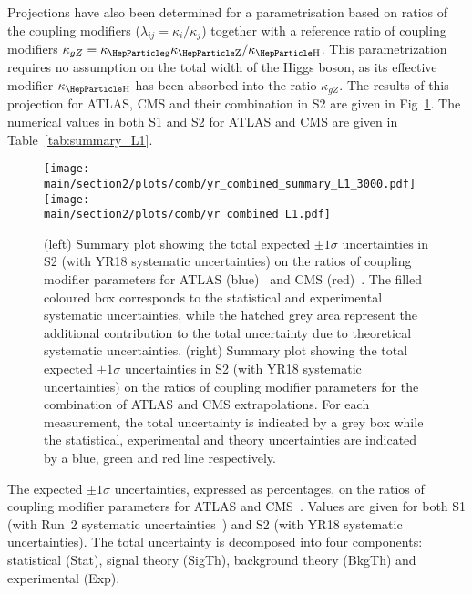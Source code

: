 Projections have also been determined for a parametrisation based on ratios of the coupling modifiers ($\lambda_{ij} = \kappa_{i}/\kappa_{j}$) together with a reference ratio of coupling modifiers $\kappa_{gZ} = \kglu\kZ/\kH$.
This parametrization requires no assumption on the total width of the Higgs boson, as its effective modifier $\kH$ has been absorbed into the ratio $\kappa_{gZ}$. The results of this projection for ATLAS, CMS and their combination in S2 are given in Fig~\ref{fig:summary_L1}.
The numerical values in both S1 and S2 for ATLAS and CMS are given in Table~\ref{tab:summary_L1}.
\begin{figure}[hbtp]
\centering
\texttt{[image: \\main/section2/plots/comb/yr\_combined\_summary\_L1\_3000.pdf]}%
\texttt{[image: \\main/section2/plots/comb/yr\_combined\_L1.pdf]}%
\caption{(left) Summary plot showing the total expected $\pm 1\sigma$ uncertainties in S2 (with YR18 systematic uncertainties) on the ratios of coupling modifier parameters  for ATLAS (blue)~\cite{ATL-PHYS-PUB-2018-054} and CMS (red)~\cite{CMS-PAS-FTR-18-011}. The filled coloured box corresponds to the statistical and experimental systematic uncertainties, while the hatched grey area represent the additional contribution to the total uncertainty due to theoretical systematic uncertainties.
(right) Summary plot showing the total expected $\pm 1\sigma$  uncertainties in S2 (with YR18 systematic uncertainties) on the ratios of coupling modifier parameters  for the combination of ATLAS and CMS extrapolations. For each measurement,  the total uncertainty is indicated by a grey box while the statistical, experimental and theory uncertainties are indicated by a blue, green and red line respectively.}
\label{fig:summary_L1}
\end{figure}


\begin{table}[hbtp]
\centering
\caption{The expected $\pm 1\sigma$ uncertainties, expressed as percentages, on the ratios of coupling modifier parameters for ATLAS and CMS~\cite{ATL-PHYS-PUB-2018-054,CMS-PAS-FTR-18-011}.  Values are given for both S1 (with Run~2 systematic uncertainties~\cite{Sirunyan:2018koj}) and S2 (with YR18 systematic uncertainties). The total uncertainty is decomposed into four components: statistical (Stat), signal theory (SigTh), background theory (BkgTh) and experimental (Exp).}
\small
\hspace{0.5cm}

\label{tab:summary_L1}
\vspace{0.5cm}
\end{table}
